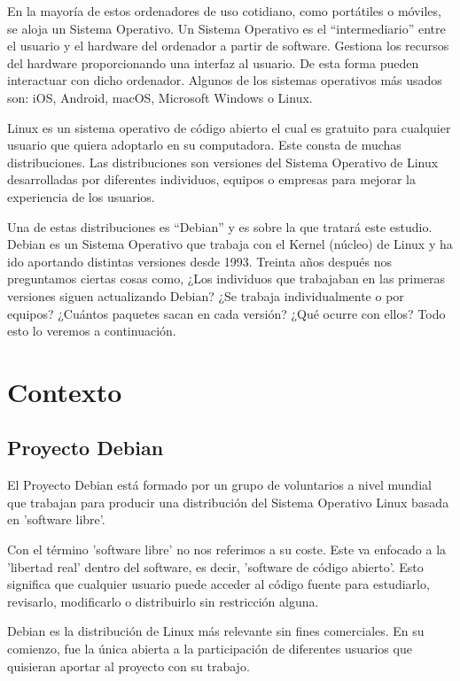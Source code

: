 \documentclass[a4paper, 12pt]{book}
\begin{document}
En la mayoría de estos ordenadores de uso cotidiano, como portátiles o móviles, se aloja un Sistema Operativo. Un Sistema Operativo es el “intermediario” entre el usuario y el hardware del ordenador a partir de software. Gestiona los recursos del hardware proporcionando una interfaz al usuario. De esta forma pueden interactuar con dicho ordenador. 
Algunos de los sistemas operativos más usados son: iOS, Android, macOS, Microsoft Windows o Linux. 

Linux es un sistema operativo de código abierto el cual es gratuito para cualquier usuario que quiera adoptarlo en su computadora. Este consta de muchas distribuciones. Las distribuciones son versiones del Sistema Operativo de Linux desarrolladas por diferentes individuos, equipos o empresas para mejorar la experiencia de los usuarios.

Una de estas distribuciones es “Debian” y es sobre la que tratará este estudio.
Debian es un Sistema Operativo que trabaja con el Kernel (núcleo) de Linux y ha ido aportando distintas versiones desde 1993. 
Treinta años después nos preguntamos ciertas cosas como, ¿Los individuos que trabajaban en las primeras versiones siguen actualizando Debian? ¿Se trabaja individualmente o por equipos? ¿Cuántos paquetes sacan en cada versión? ¿Qué ocurre con ellos? Todo esto lo veremos a continuación.



\section{Contexto}
\label{sec:contexto}



\subsection{Proyecto Debian}
\label{subsec:proyecto debian}

El Proyecto Debian está formado por un grupo de voluntarios a nivel mundial que trabajan para producir una distribución del Sistema Operativo Linux basada en 'software libre'.

Con el término 'software libre' no nos referimos a su coste. Este va enfocado a la 'libertad real' dentro del software, es decir, 'software de código abierto'.
Esto significa que cualquier usuario puede acceder al código fuente para estudiarlo, revisarlo, modificarlo o distribuirlo sin restricción alguna.

Debian es la distribución de Linux más relevante sin fines comerciales.
En su comienzo, fue la única abierta a la participación de diferentes usuarios que quisieran aportar al proyecto con su trabajo.
\end{document}
